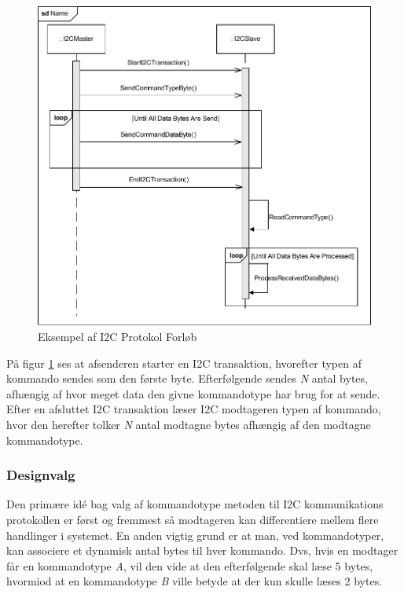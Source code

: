 \begin{figure}[H]
	\centering
	\includegraphics[width=\textwidth] {Systemarkitektur/images/I2CProtocol}
	\caption{Eksempel af I2C Protokol Forløb}
	\label{fig:I2CProtokolEksempel}
\end{figure}

På figur \ref{fig:I2CProtokolEksempel} ses at afsenderen starter en I2C transaktion, hvorefter typen af kommando sendes som den første byte. Efterfølgende sendes \textit{N} antal bytes, afhængig af hvor meget data den givne kommandotype har brug for at sende. Efter en afsluttet I2C transaktion læser I2C modtageren typen af kommando, hvor den herefter tolker \textit{N} antal modtagne bytes afhængig af den modtagne kommandotype.

\subsubsection{Designvalg}
Den primære idé bag valg af kommandotype metoden til I2C kommunikations protokollen er først og fremmest så modtageren kan differentiere mellem flere handlinger i systemet. En anden vigtig grund er at man, ved kommandotyper, kan associere et dynamisk antal bytes til hver kommando. Dvs, hvis en modtager får en kommandotype \textit{A}, vil den vide at den efterfølgende skal læse 5 bytes, hvormiod at en kommandotype \textit{B} ville betyde at der kun skulle læses 2 bytes.

